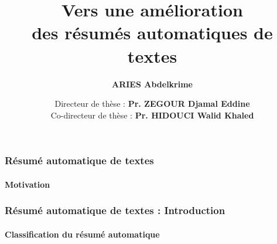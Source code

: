 \documentclass[xcolor=table]{beamer}
\title[Thèse : Vers une amélioration des RAT] %
{Vers une amélioration \\des résumés automatiques de textes}
\institute{ %
		École nationale Supérieure d'Informatique (ESI, ex. INI), Alger, Algérie 
		
		École doctorale STIC (2010/2011)
		
		Spécialité : Informatique répartie et mobile (IRM)
		
		Laboratoire LCSI - Groupe D3
		
		Année d'inscription en doctorat : (2013/2014)	
}
\author[ \textbf{\footnotesize\insertframenumber/\inserttotalframenumber} \hspace*{1.5cm} ESI - ARIES (2020)] %
{\Large\bfseries ARIES Abdelkrime}
\date{\footnotesize
Directeur de thèse : \textbf{Pr. ZEGOUR Djamal Eddine} \\
Co-directeur de thèse : \textbf{Pr. HIDOUCI Walid Khaled}
} %
\begin{document}
\begin{frame}
\frametitle{Résumé automatique de textes}
\framesubtitle{Motivation}

\vspace{-12pt}

%

\end{frame}

\begin{frame}
	\frametitle{Résumé automatique de textes : Introduction}
	\framesubtitle{Classification du résumé automatique}
	
\end{frame}
\end{document}
